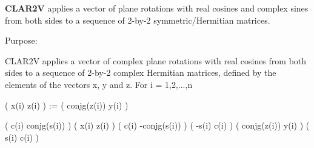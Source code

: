{\bfseries C\+L\+A\+R2\+V} applies a vector of plane rotations with real cosines and complex sines from both sides to a sequence of 2-\/by-\/2 symmetric/\+Hermitian matrices. 

 \begin{DoxyParagraph}{Purpose\+: }
\begin{DoxyVerb} CLAR2V applies a vector of complex plane rotations with real cosines
 from both sides to a sequence of 2-by-2 complex Hermitian matrices,
 defined by the elements of the vectors x, y and z. For i = 1,2,...,n

    (       x(i)  z(i) ) :=
    ( conjg(z(i)) y(i) )

      (  c(i) conjg(s(i)) ) (       x(i)  z(i) ) ( c(i) -conjg(s(i)) )
      ( -s(i)       c(i)  ) ( conjg(z(i)) y(i) ) ( s(i)        c(i)  )\end{DoxyVerb}
 
\end{DoxyParagraph}

